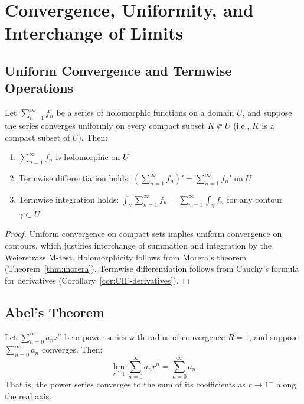 \section{Convergence, Uniformity, and Interchange of Limits}
\label{sec:dirichlet-convergence}

\subsection{Uniform Convergence and Termwise Operations}

\begin{lemma}\label{lem:uniform-window}
Let $\sum_{n=1}^{\infty} f_n$ be a series of holomorphic functions on a domain $U$, and suppose the series converges uniformly on every compact subset $K \Subset U$ (i.e., $K$ is a compact subset of $U$). Then:
\begin{enumerate}
\item $\sum_{n=1}^{\infty} f_n$ is holomorphic on $U$
\item Termwise differentiation holds: $\displaystyle \left( \sum_{n=1}^{\infty} f_n \right)' = \sum_{n=1}^{\infty} f_n'$ on $U$
\item Termwise integration holds: $\displaystyle \int_{\gamma} \sum_{n=1}^{\infty} f_n = \sum_{n=1}^{\infty} \int_{\gamma} f_n$ for any contour $\gamma \subset U$
\end{enumerate}
\end{lemma}

\begin{proof}
Uniform convergence on compact sets implies uniform convergence on contours, which justifies interchange of summation and integration by the Weierstrass M-test. Holomorphicity follows from Morera's theorem (Theorem~\ref{thm:morera}). Termwise differentiation follows from Cauchy's formula for derivatives (Corollary~\ref{cor:CIF-derivatives}).
\end{proof}

\subsection{Abel's Theorem}

\begin{theorem}\label{thm:abel}
Let $\sum_{n=0}^{\infty} a_n z^n$ be a power series with radius of convergence $R = 1$, and suppose $\sum_{n=0}^{\infty} a_n$ converges. Then:
\begin{equation}
\lim_{r \uparrow 1} \sum_{n=0}^{\infty} a_n r^n = \sum_{n=0}^{\infty} a_n
\end{equation}
That is, the power series converges to the sum of its coefficients as $r \to 1^-$ along the real axis.
\end{theorem}

